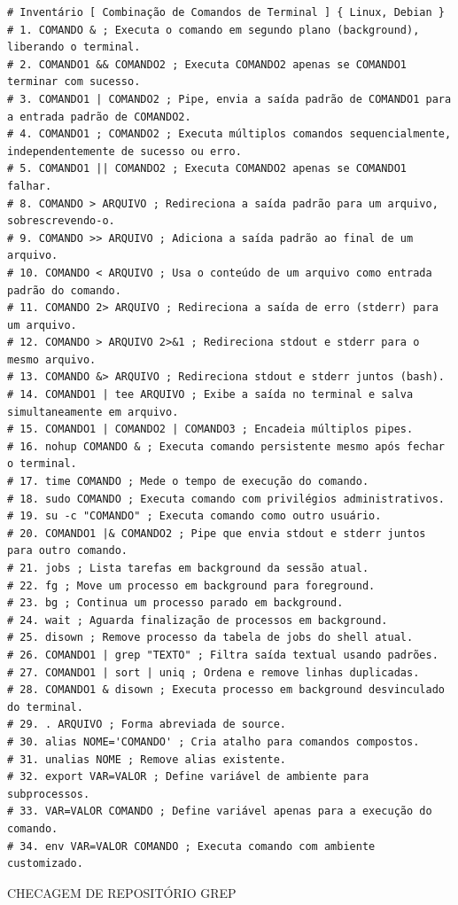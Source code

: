 \documentclass[12pt,a4paper]{article}
\begin{document}
\begin{lstlisting}
# Inventário [ Combinação de Comandos de Terminal ] { Linux, Debian }
# 1. COMANDO & ; Executa o comando em segundo plano (background), liberando o terminal.
# 2. COMANDO1 && COMANDO2 ; Executa COMANDO2 apenas se COMANDO1 terminar com sucesso.
# 3. COMANDO1 | COMANDO2 ; Pipe, envia a saída padrão de COMANDO1 para a entrada padrão de COMANDO2.
# 4. COMANDO1 ; COMANDO2 ; Executa múltiplos comandos sequencialmente, independentemente de sucesso ou erro.
# 5. COMANDO1 || COMANDO2 ; Executa COMANDO2 apenas se COMANDO1 falhar.
# 8. COMANDO > ARQUIVO ; Redireciona a saída padrão para um arquivo, sobrescrevendo-o.
# 9. COMANDO >> ARQUIVO ; Adiciona a saída padrão ao final de um arquivo.
# 10. COMANDO < ARQUIVO ; Usa o conteúdo de um arquivo como entrada padrão do comando.
# 11. COMANDO 2> ARQUIVO ; Redireciona a saída de erro (stderr) para um arquivo.
# 12. COMANDO > ARQUIVO 2>&1 ; Redireciona stdout e stderr para o mesmo arquivo.
# 13. COMANDO &> ARQUIVO ; Redireciona stdout e stderr juntos (bash).
# 14. COMANDO1 | tee ARQUIVO ; Exibe a saída no terminal e salva simultaneamente em arquivo.
# 15. COMANDO1 | COMANDO2 | COMANDO3 ; Encadeia múltiplos pipes.
# 16. nohup COMANDO & ; Executa comando persistente mesmo após fechar o terminal.
# 17. time COMANDO ; Mede o tempo de execução do comando.
# 18. sudo COMANDO ; Executa comando com privilégios administrativos.
# 19. su -c "COMANDO" ; Executa comando como outro usuário.
# 20. COMANDO1 |& COMANDO2 ; Pipe que envia stdout e stderr juntos para outro comando.
# 21. jobs ; Lista tarefas em background da sessão atual.
# 22. fg ; Move um processo em background para foreground.
# 23. bg ; Continua um processo parado em background.
# 24. wait ; Aguarda finalização de processos em background.
# 25. disown ; Remove processo da tabela de jobs do shell atual.
# 26. COMANDO1 | grep "TEXTO" ; Filtra saída textual usando padrões.
# 27. COMANDO1 | sort | uniq ; Ordena e remove linhas duplicadas.
# 28. COMANDO1 & disown ; Executa processo em background desvinculado do terminal.
# 29. . ARQUIVO ; Forma abreviada de source.
# 30. alias NOME='COMANDO' ; Cria atalho para comandos compostos.
# 31. unalias NOME ; Remove alias existente.
# 32. export VAR=VALOR ; Define variável de ambiente para subprocessos.
# 33. VAR=VALOR COMANDO ; Define variável apenas para a execução do comando.
# 34. env VAR=VALOR COMANDO ; Executa comando com ambiente customizado.
\end{lstlisting}

CHECAGEM DE REPOSITÓRIO GREP\\
\end{document}
